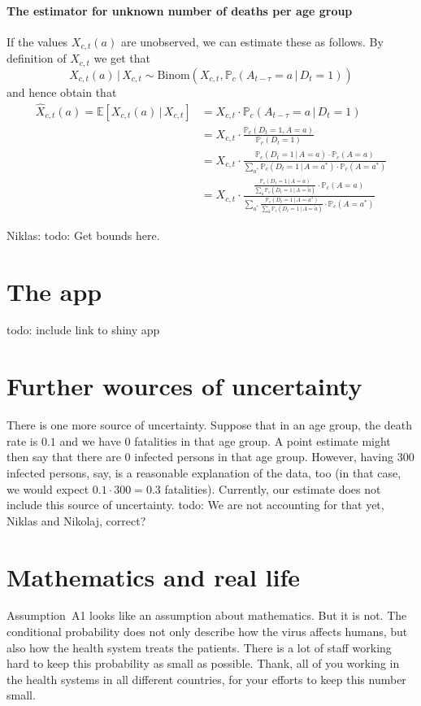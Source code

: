 \documentclass[a4paper]{article}
\newcommand\todo[1]{{\color{red}todo: #1}}
\renewcommand\P{\mathbb{P}}
\newcommand\E{\mathbb{E}}
\newcommand{\given}{\, \vert \,}
\newcommand\Niklas[1]{{\color{Fuchsia}Niklas: #1}}
\begin{document}
\paragraph{The estimator for unknown number of deaths per age group}
%
If the values $X_{c,t}(a)$ are unobserved, we can estimate these as follows. By definition of $X_{c,t}$ we get that
$$X_{c,t}(a) \given X_{c,t} \sim \text{Binom}(X_{c,t}, \P_c(A_{t-\tau} = a \given D_{t} = 1))$$
and hence obtain that
\begin{align*}
\hat{X}_{c,t}(a) = \E[X_{c,t}(a) \given X_{c,t}] 	
&= X_{c,t} \cdot \P_c(A_{t-\tau} = a \given D_{t} = 1) \\
     &= 
X_{c,t} \cdot 
\frac{  
    \P_c(D_t = 1, A = a)}
  {\P_c(D_t = 1)}\\
    &= 
X_{c,t} \cdot 
\frac{  
    \P_c(D_t = 1\given A = a)
     \cdot \P_c(A = a)}
  {\sum_{a^*}  
    \P_c(D_t = 1\given A = a^*) \cdot \P_c(A = a^*)
    }\\
&= 
X_{c,t} \cdot 
\frac{
  \frac{
    \P_c(D_t = 1\given A = a)}
    {\sum_{\tilde{a}} \P_c(D_t = 1 \given A = \tilde{a})} \cdot \P_c(A = a)}
  {\sum_{a^*}  
  \frac{
    \P_c(D_t = 1\given A = a^*)}
    {\sum_{\tilde{a}} \P_c(D_t = 1 \given A = \tilde{a})} \cdot \P_c(A = a^*)}
\end{align*}

\Niklas{todo: Get bounds here.}


\section{The app}
\todo{include link to shiny app}


\section{Further wources of uncertainty}
There is one more source of uncertainty. 
Suppose that in an age group, the death rate is $0.1$ and we have 
$0$ fatalities in that age group.
A point estimate might then say that there are $0$ infected persons
in that age group. However, having $300$ infected persons, say,
is a reasonable explanation of the data, too (in that case, we would expect $0.1\cdot 300 = 0.3$ fatalities).
Currently, our estimate does not include this source of uncertainty. 
\todo{We are not accounting for that yet, Niklas and Nikolaj, correct?}



\section{Mathematics and real life}
Assumption~A1 looks like an assumption about mathematics. 
But it is not. 
The conditional probability does not 
only describe how
the virus affects humans, 
but also how the health system treats the patients. 
There is a lot of staff working hard to 
keep this probability as small as possible. 
Thank, all of you working in the health systems in all different countries, for 
your efforts to keep this number small. 
\end{document}
